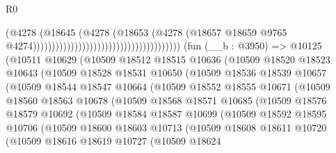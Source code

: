 \begin{lexlean}{R0}
\begin{coremodule}
                                                                      (@4278
                                                                        (@18645
                                                                          (@4278
                                                                            (@18653
                                                                              (@4278
                                                                                (@18657
                                                                                  @18659
                                                                                  @9765
                                                                                  @4274)))))))))))))))))))))))))))))))))))))))
    (fun (__b : @3950) =>
    @10125
      (@10511
        @10629
        (@10509
          @18512
          @18515
          @10636
          (@10509
            @18520
            @18523
            @10643
            (@10509
              @18528
              @18531
              @10650
              (@10509
                @18536
                @18539
                @10657
                (@10509
                  @18544
                  @18547
                  @10664
                  (@10509
                    @18552
                    @18555
                    @10671
                    (@10509
                      @18560
                      @18563
                      @10678
                      (@10509
                        @18568
                        @18571
                        @10685
                        (@10509
                          @18576
                          @18579
                          @10692
                          (@10509
                            @18584
                            @18587
                            @10699
                            (@10509
                              @18592
                              @18595
                              @10706
                              (@10509
                                @18600
                                @18603
                                @10713
                                (@10509
                                  @18608
                                  @18611
                                  @10720
                                  (@10509
                                    @18616
                                    @18619
                                    @10727
                                    (@10509
                                      @18624

\end{coremodule}
\end{lexlean}
